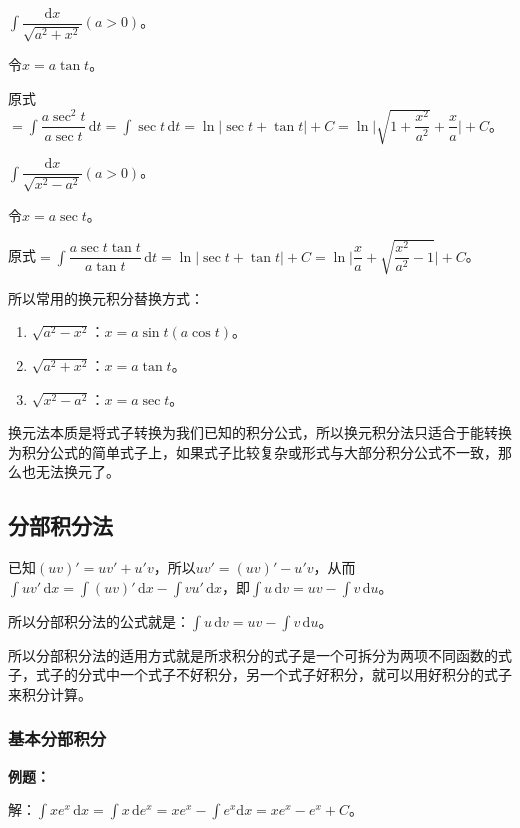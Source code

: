\documentclass[UTF8, 12pt]{ctexart}
\begin{document}
$\displaystyle{\int\dfrac{\textrm{d}x}{\sqrt{a^2+x^2}}}(a>0)$。

令$x=a\tan t$。

原式$=\displaystyle{\int\dfrac{a\sec^2t}{a\sec t}\,\textrm{d}t=\int\sec t\,\textrm{d}t}=\ln\vert\sec t+\tan t\vert+C=\ln\bigg\vert\sqrt{1+\dfrac{x^2}{a^2}}+\dfrac{x}{a}\bigg\vert+C$。

$\displaystyle{\int\dfrac{\textrm{d}x}{\sqrt{x^2-a^2}}}(a>0)$。

令$x=a\sec t$。

原式$=\displaystyle{\int\dfrac{a\sec t\tan t}{a\tan t}\,\textrm{d}t}=\ln\bigg\vert\sec t+\tan t\bigg\vert+C=\ln\bigg\vert\dfrac{x}{a}+\sqrt{\dfrac{x^2}{a^2}-1}\vert+C$。\medskip

所以常用的换元积分替换方式：

\begin{enumerate}
    \item $\sqrt{a^2-x^2}$：$x=a\sin t(a\cos t)$。
    \item $\sqrt{a^2+x^2}$：$x=a\tan t$。
    \item $\sqrt{x^2-a^2}$：$x=a\sec t$。
\end{enumerate}

换元法本质是将式子转换为我们已知的积分公式，所以换元积分法只适合于能转换为积分公式的简单式子上，如果式子比较复杂或形式与大部分积分公式不一致，那么也无法换元了。

\subsection{分部积分法}

已知$(uv)'=uv'+u'v$，所以$uv'=(uv)'-u'v$，从而$\int uv'\,\textrm{d}x=\int(uv)'\,\textrm{d}x-\int vu'\,\textrm{d}x$，即$\int u\,\textrm{d}v=uv-\int v\,\textrm{d}u$。

所以分部积分法的公式就是：$\int u\,\textrm{d}v=uv-\int v\,\textrm{d}u$。

所以分部积分法的适用方式就是所求积分的式子是一个可拆分为两项不同函数的式子，式子的分式中一个式子不好积分，另一个式子好积分，就可以用好积分的式子来积分计算。

\subsubsection{基本分部积分}

\textbf{例题：}

解：$\int xe^x\,\textrm{d}x=\int x\,\textrm{d}e^x=xe^x-\int e^x\textrm{d}x=xe^x-e^x+C$。
\end{document}

